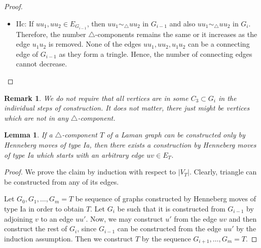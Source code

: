 \documentclass[a4paper, 11pt]{article}
\newcommand{\trcomp}{$\triangle$-component}
\newcommand{\trcomps}{$\triangle$-components}
\newtheorem{lem}[thm]{Lemma}
\newtheorem*{rem}{Remark}
\theoremstyle{definition}
\begin{document}
\begin{proof}
\begin{itemize}
\begin{itemize}
		\item IIc: If $uu_1, uu_2\in E_{G_{i-1}}$, then $uu_1 \sim_{\!\!\bigtriangleup} uu_2$ in $G_{i-1}$ and also  $uu_1 \sim_{\!\!\bigtriangleup} uu_2$ in $G_{i}$. Therefore, the number \trcomps{} remains the same or it increases as the edge $u_1u_2$ is removed. None of the edges $uu_1, uu_2, u_1u_2$ can be a connecting edge of $G_{i-1}$ as they form a tringle. Hence, the number of connecting edges cannot decrease.
	\end{itemize}
\end{itemize}
\end{proof}

\begin{rem}
We do not require that all vertices are in some $C_3\subset G_i$ in the individual steps of construction. It does not matter, there just might be vertices which are not in any \trcomp{}.
\end{rem}

\begin{lem}
\label{lem:startWithArbitraryEdge}
If a \trcomp{} $T$ of a Laman graph can be constructed only by Henneberg moves of type Ia, then there exists a construction by Henneberg moves of type Ia which starts with an arbitrary edge $uv\in E_T$.
\end{lem}
\begin{proof}
We prove the claim by induction with respect to $|V_T|$. Clearly, triangle can be constructed from any of its edges. 

Let $G_0, G_1, \dots, G_m=T$ be sequence of graphs constructed by Henneberg moves of type Ia in order to obtain $T$. Let $G_i$ be such that it is constructed from $G_{i-1}$ by adjoining $v$ to an edge $uu'$. Now, we may construct $u'$ from the edge $uv$ and then construct the rest of $G_i$, since $G_{i-1}$ can be constructed from the edge $uu'$ by the induction assumption. Then we construct $T$ by the sequence $G_{i+1}, \dots, G_m=T$.
\end{proof}
\end{document}

